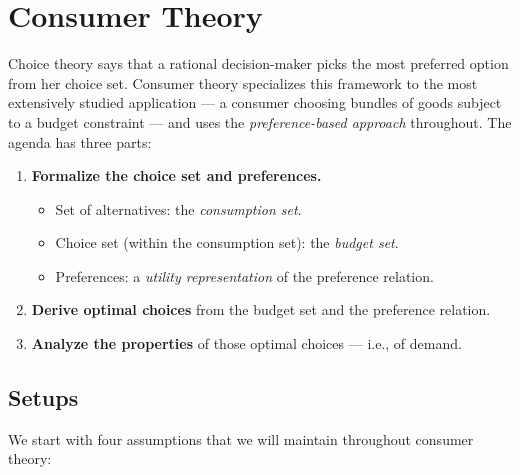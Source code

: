\chapter{Consumer Theory}

Choice theory says that a rational decision-maker picks the most
preferred option from her choice set. Consumer theory specializes this
framework to the most extensively studied application — a consumer
choosing bundles of goods subject to a budget constraint — and uses the
\emph{preference-based approach} throughout. The agenda has three parts:

\begin{enumerate}

\item
  \textbf{Formalize the choice set and preferences.}
  \begin{itemize}
  \item
    Set of alternatives: the \emph{consumption set}.
  \item
    Choice set (within the consumption set): the \emph{budget set}.
  \item
    Preferences: a \emph{utility representation} of the preference
    relation.
  \end{itemize}
\item
  \textbf{Derive optimal choices} from the budget set and the preference
  relation.
\item
  \textbf{Analyze the properties} of those optimal choices — i.e., of
  demand.
\end{enumerate}

\section{Setups}\label{setups}

We start with four assumptions that we will maintain throughout consumer
theory:


